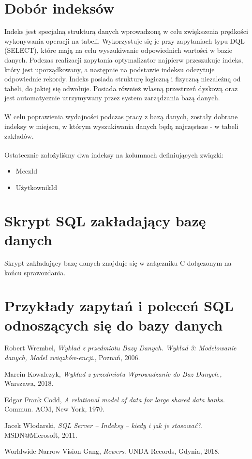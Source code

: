 \documentclass{mwrep}
\begin{document}
\section{Dobór indeksów}
Indeks jest specjalną strukturą danych wprowadzoną w celu 
zwiększenia prędkości wykonywania operacji na tabeli.
Wykorzystuje się je przy zapytaniach typu DQL (SELECT), które mają na celu wyszukiwanie
odpowiednich wartości w bazie danych. Podczas realizacji zapytania optymalizator
najpierw przeszukuje indeks, który jest uporządkowany, a następnie na podstawie indeksu 
odczytuje odpowiednie rekordy. Indeks posiada strukturę logiczną i fizyczną niezależną od 
tabeli, do jakiej się odwołuje. Posiada również własną przestrzeń dyskową oraz jest automatycznie 
utrzymywany przez system zarządzania bazą danych\cite{msdn}.
\\
\\
\indent W celu poprawienia wydajności podczas pracy z bazą danych, 
zostały dobrane indeksy w miejscu, w którym wyszukiwania danych będą najczęstsze - w tabeli zakładów.
\\ \\
Ostatecznie założyliśmy dwa indeksy na kolumnach definiujących związki:
\begin{itemize}
	\item MeczId
	\item UżytkownikId
\end{itemize}

\section{Skrypt SQL zakładający bazę danych}
Skrypt zakładający bazę danych znajduje się w załączniku C dołączonym na końcu sprawozdania.

\section{Przykłady zapytań i poleceń SQL odnoszących się do bazy danych}

\begin{thebibliography}{9}
	  Robert Wrembel,
	  \emph{Wykład z przedmiotu Bazy Danych. Wykład 3: Modelowanie danych, Model związków-encji}.,
	  Poznań,
	  2006.

	
	  Marcin Kowalczyk,
	  \emph{Wykład z przedmiotu Wprowadzanie do Baz Danych}.,
	  Warszawa,
	  2018.

	  Edgar Frank Codd,
	  \emph{A relational model of data for large shared data banks}.
	  Commun. ACM,
	  New York,
	  1970.

	  Jacek Włodarski,
	  \emph{SQL Server – Indeksy – kiedy i jak je stosować?}.
	  MSDN@Microsoft,
	  2011.

	  Worldwide Narrow Vision Gang,
	  \emph{Rewers}.
	  UNDA Records,
	  Gdynia,
	  2018.
	
\end{thebibliography}
\end{document}
